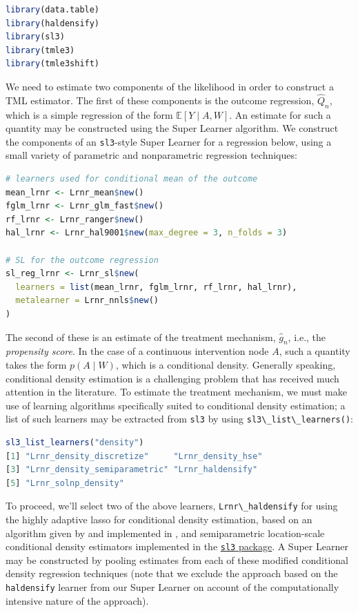 \documentclass[
  12pt, krantz2,
]{krantz}
\newcommand{\passthrough}[1]{#1}
\theoremstyle{definition}
\theoremstyle{definition}
\theoremstyle{definition}
\newcommand{\E}{\mathbb{E}}
\newcommand{\1}{\mathbbm{1}}
\begin{document}
\begin{lstlisting}[language=R]
library(data.table)
library(haldensify)
library(sl3)
library(tmle3)
library(tmle3shift)
\end{lstlisting}

We need to estimate two components of the likelihood in order to construct a TML
estimator. The first of these components is the outcome regression, \(\hat{Q}_n\),
which is a simple regression of the form \(\E[Y \mid A,W]\). An estimate
for such a quantity may be constructed using the Super Learner algorithm. We
construct the components of an \passthrough{\lstinline!sl3!}-style Super Learner for a regression below,
using a small variety of parametric and nonparametric regression techniques:

\begin{lstlisting}[language=R]
# learners used for conditional mean of the outcome
mean_lrnr <- Lrnr_mean$new()
fglm_lrnr <- Lrnr_glm_fast$new()
rf_lrnr <- Lrnr_ranger$new()
hal_lrnr <- Lrnr_hal9001$new(max_degree = 3, n_folds = 3)

# SL for the outcome regression
sl_reg_lrnr <- Lrnr_sl$new(
  learners = list(mean_lrnr, fglm_lrnr, rf_lrnr, hal_lrnr),
  metalearner = Lrnr_nnls$new()
)
\end{lstlisting}

The second of these is an estimate of the treatment mechanism, \(\hat{g}_n\),
i.e., the \emph{propensity score}. In the case of a continuous intervention node \(A\),
such a quantity takes the form \(p(A \mid W)\), which is a conditional density.
Generally speaking, conditional density estimation is a challenging problem that
has received much attention in the literature. To estimate the treatment
mechanism, we must make use of learning algorithms specifically suited to
conditional density estimation; a list of such learners may be extracted from
\passthrough{\lstinline!sl3!} by using \passthrough{\lstinline!sl3\_list\_learners()!}:

\begin{lstlisting}[language=R]
sl3_list_learners("density")
[1] "Lrnr_density_discretize"     "Lrnr_density_hse"           
[3] "Lrnr_density_semiparametric" "Lrnr_haldensify"            
[5] "Lrnr_solnp_density"         
\end{lstlisting}

To proceed, we'll select two of the above learners, \passthrough{\lstinline!Lrnr\_haldensify!} for using
the highly adaptive lasso for conditional density estimation, based on an
algorithm given by \citet{diaz2011super} and implemented in \citet{hejazi2020haldensify}, and
semiparametric location-scale conditional density estimators implemented in the
\href{https://github.com/tlverse/sl3}{\passthrough{\lstinline!sl3!} package}. A Super Learner may be
constructed by pooling estimates from each of these modified conditional density
regression techniques (note that we exclude the approach based on the
\passthrough{\lstinline!haldensify!} learner from our Super Learner on account of the computationally
intensive nature of the approach).
\end{document}
